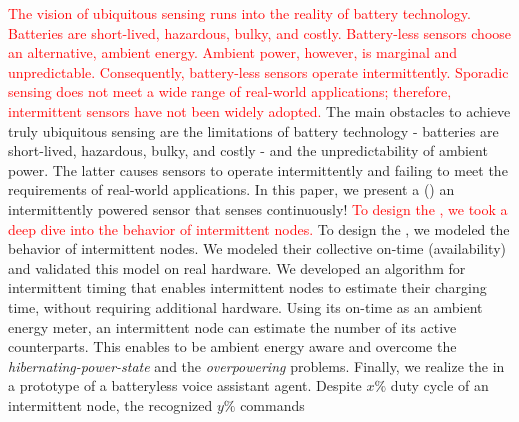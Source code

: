 \textcolor{red}{The vision of ubiquitous sensing runs into the reality of battery technology. Batteries are short-lived, hazardous, bulky, and costly. Battery-less sensors choose an alternative, ambient energy. Ambient power, however, is marginal and unpredictable. Consequently, battery-less sensors operate intermittently. Sporadic sensing does not meet a wide range of real-world applications; therefore, intermittent sensors have not been widely adopted.} 
%
The main obstacles to achieve truly ubiquitous sensing are the limitations of battery technology - batteries are short-lived, hazardous, bulky, and costly - and the unpredictability of ambient power. The latter causes sensors to operate intermittently and failing to meet the requirements of real-world applications. In this paper, we
%
present a \textit{\fullsys} (\sys) an intermittently powered sensor that senses continuously! 
%
\textcolor{red}{To design the \sys, we took a deep dive into the behavior of intermittent nodes.}
%
To design the \sys, we modeled the behavior of intermittent nodes.
%
We modeled their collective on-time (\sys availability) and validated this model on real hardware. We developed an algorithm for intermittent timing that enables intermittent nodes to estimate their  charging time, without requiring additional hardware. Using its on-time as an ambient energy meter, an intermittent node can estimate the number of its active counterparts. This enables \sys to be ambient energy aware and overcome the \textit{hibernating-power-state} and the \textit{overpowering} problems. Finally, we realize the \sys in a prototype of a batteryless voice assistant agent. Despite $x\%$ duty cycle of an intermittent node, the \fullcim recognized $y\%$ commands
%
